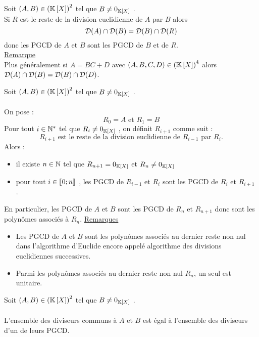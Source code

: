 \begin{prop}
    Soit \((A, B) \in \left(\mathbb{K}\left[X\right]\right)^2\) tel que \(B\neq 0_{\mathbb{K}\left[X\right]}\) .\\
    Si \(R\) est le reste de la division euclidienne de \(A\) par \(B\) alors
    \[\mathcal{D}(A) \cap \mathcal{D}(B) = \mathcal{D}(B) \cap \mathcal{D}(R)\]
    donc les PGCD de \(A\) et \(B\) sont les PGCD de \(B\) et de \(R\).\\
    \underline{Remarque} \\
    Plus généralement si \(A = BC + D\) avec \((A, B, C, D) \in \left(\mathbb{K}\left[X\right]\right)^4\) alors \(\mathcal{D}(A) \cap \mathcal{D}(B) = \mathcal{D}(B) \cap \mathcal{D}(D)\).
\end{prop}

\begin{defprop}
    Soit \((A, B) \in \left(\mathbb{K}\left[X\right]\right)^2\) tel que \(B\neq 0_{\mathbb{K}\left[X\right]}\) . \\~\\
    On pose :
    \[R_0 = A \text{ et }R_1 = B\]
    Pour tout \(i \in \mathbb{N}^*\) tel que \(R_i\neq 0_{\mathbb{K}\left[X\right]}\) , on définit \(R_{i+1}\) comme suit :
    \[R_{i+1} \text{ est le reste de la division euclidienne de } R_{i-1} \text{ par } R_i.\]
    Alors :
    \begin{itemize}
        \item il existe \(n \in \mathbb{N}\) tel que \(R_{n+1} = 0_{\mathbb{K}\left[X\right]}\)  et \(R_n\neq 0_{\mathbb{K}\left[X\right]}\) 
        \item pour tout \(i \in \left\llbracket0;n\right\rrbracket\) , les PGCD de \(R_{i-1}\) et \(R_i\) sont les PGCD de \(R_i\) et \(R_{i+1}\) .
    \end{itemize}
    En particulier, les PGCD de \(A\) et \(B\) sont les PGCD de \(R_n\) et \(R_{n+1}\) donc sont les polynômes associés à \(R_n\).
    \underline{Remarques} \\
    \begin{itemize}
        \item Les PGCD de \(A\) et \(B\) sont les polynômes associés au dernier reste non nul dans l’algorithme d’Euclide encore appelé algorithme des divisions euclidiennes successives.
        \item Parmi les polynômes associés au dernier reste non nul \(R_n\), un seul est unitaire.
    \end{itemize}
\end{defprop}

\begin{defprop}
Soit \((A, B) \in \left(\mathbb{K}\left[X\right]\right)^2\) tel que \(B\neq 0_{\mathbb{K}\left[X\right]}\) . \\~\\
L’ensemble des diviseurs communs à \(A\) et \(B\) est égal à l’ensemble des diviseurs d’un de leurs PGCD.
\end{defprop}

